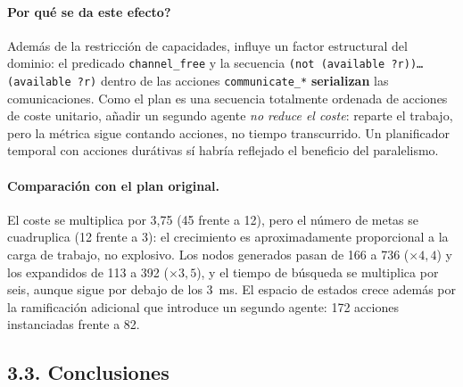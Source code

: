\documentclass[12pt,a4paper]{article}
\begin{document}
\paragraph{\textquestiondown Por qu\'e se da este efecto?}
Adem\'as de la restricci\'on de capacidades, influye un factor estructural del
dominio: el predicado \texttt{channel\_free} y la secuencia
\texttt{(not (available ?r))\dots(available ?r)} dentro de las acciones
\texttt{communicate\_*} \textbf{serializan} las comunicaciones. Como el plan
es una secuencia totalmente ordenada de acciones de coste unitario, a\~nadir
un segundo agente \emph{no reduce el coste}: reparte el trabajo, pero la
m\'etrica sigue contando acciones, no tiempo transcurrido. Un planificador
temporal con acciones dur\'ativas s\'i habr\'ia reflejado el beneficio del
paralelismo.

\paragraph{Comparaci\'on con el plan original.}
El coste se multiplica por 3,75 (45 frente a 12), pero el n\'umero de metas se
cuadruplica (12 frente a 3): el crecimiento es aproximadamente proporcional a
la carga de trabajo, no explosivo. Los nodos generados pasan de 166 a 736
($\times4{,}4$) y los expandidos de 113 a 392 ($\times3{,}5$), y el tiempo de
b\'usqueda se multiplica por seis, aunque sigue por debajo de los 3~ms. El
espacio de estados crece adem\'as por la ramificaci\'on adicional que introduce
un segundo agente: 172 acciones instanciadas frente a 82.

\subsection{3.3. Conclusiones}
\end{document}
